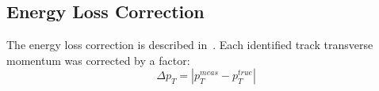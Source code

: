 \subsection{Energy Loss Correction}\label{section:star_energyLoss}
The energy loss correction is described in~\cite{supplementaryNote}. Each identified track transverse momentum was corrected by a factor:
\begin{equation}
\Delta p_T = |p_T^{meas}-p_T^{true}|
\end{equation}


